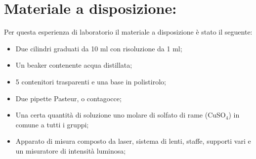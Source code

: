 \section{Materiale a disposizione:}

Per questa esperienza di laboratorio il materiale a disposizione è stato il seguente:
\begin{itemize}
	\item{Due cilindri graduati da 10 $\si{\milli\litre}$ con risoluzione da 1 $\si{\milli\litre}$;}
    \item{Un beaker contenente acqua distillata;}
	\item{5 contenitori trasparenti e una base in polistirolo;}
	\item{Due pipette Pasteur, o contagocce;}
	\item{Una certa quantità di soluzione uno molare di solfato di rame (CuSO$_4$) in comune a tutti i gruppi;}
	\item{Apparato di misura composto da laser, sistema di lenti, staffe, supporti vari e un misuratore di intensità luminosa;}
\end{itemize}
